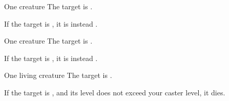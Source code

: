 \begin{spellheader}
    \spellrng{\rngclose}
    \spelldur{\durshort}
\end{spellheader}
\begin{spelleffects}
    \begin{spelltarget}{One creature}
        \spelleffect The target is \sickened.

        If the target is \bloodied, it is instead \blinded.
    \end{spelltarget}
\end{spelleffects}
\begin{spellfooter}
    
\end{spellfooter}

\begin{spellheader}
    \spellrng{\rngclose}
    \spelldur{\durshort}
\end{spellheader}
\begin{spelleffects}
    \begin{spelltarget}{One creature}
        \spelleffect The target is \bewildered.

        If the target is \bloodied, it is instead \confused.
    \end{spelltarget}
\end{spelleffects}
\begin{spellfooter}
    
\end{spellfooter}

\begin{spellheader}
    \spellrng{\rngclose}
    \spelldur{\durshort}
\end{spellheader}
\begin{spelleffects}
    \begin{spelltarget}{One living creature}
        \spelleffect The target is \sickened.

        If the target is \bloodied, and its level does not exceed your caster level, it dies.
    \end{spelltarget}
\end{spelleffects}
\begin{spellfooter}
    
\end{spellfooter}

